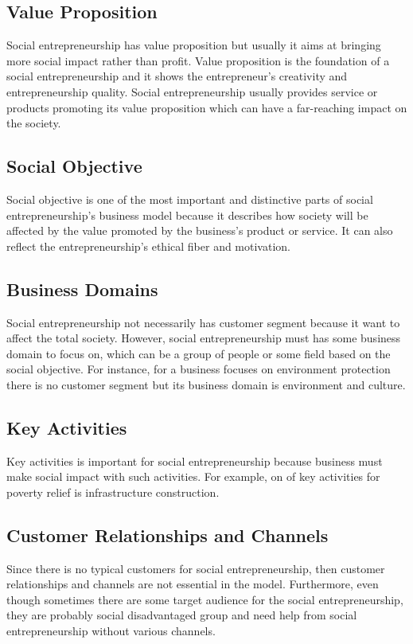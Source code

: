 \documentclass[12pt]{article}
\begin{document}
\subsection{Value Proposition}
Social entrepreneurship has value proposition but usually it aims at bringing more social impact rather than profit. Value proposition is the foundation of a social entrepreneurship and it shows the entrepreneur's creativity and entrepreneurship quality. Social entrepreneurship usually provides service or products promoting its value proposition which can have a far-reaching impact on the society. 
\subsection{Social Objective}
Social objective is one of the most important and distinctive parts of social entrepreneurship's business model because it describes how society will be affected by the value promoted by the business's product or service. It can also reflect the entrepreneurship's ethical fiber and motivation.
\subsection{Business Domains}
Social entrepreneurship not necessarily has customer segment because it want to affect the total society. However, social entrepreneurship must has some business domain to focus on, which can be a group of people or some field based on the social objective. For instance, for a business focuses on environment protection there is no customer segment but its business domain is environment and culture.
\subsection{Key Activities}
Key activities is important for social entrepreneurship because business must make social impact with such activities. For example, on of key activities for poverty relief is infrastructure construction.
\subsection{Customer Relationships and Channels}
Since there is no typical customers for social entrepreneurship, then customer relationships and channels are not essential in the model. Furthermore, even though sometimes there are some target audience for the social entrepreneurship, they are probably social disadvantaged group and need help from social entrepreneurship without various channels. 
\end{document}
